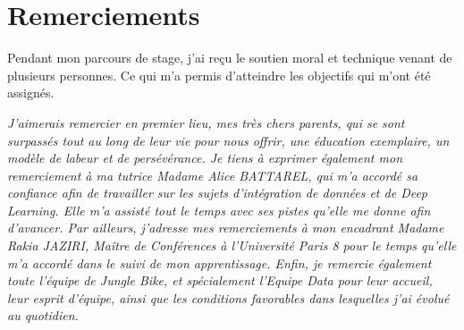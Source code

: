 
\chapter*{Remerciements}
Pendant mon parcours de stage, j'ai reçu le soutien moral et technique venant de plusieurs personnes. Ce qui m'a permis d'atteindre les objectifs qui m'ont été assignés.

\textit{J’aimerais remercier en premier lieu, mes très chers parents, qui se sont surpassés tout au
long de leur vie pour nous offrir, une éducation exemplaire, un modèle de
labeur et de persévérance.
\newline
\newline
Je tiens à exprimer également mon remerciement à ma tutrice Madame Alice BATTAREL, qui m'a accordé sa confiance afin de travailler sur les sujets d'intégration de données et de Deep Learning. Elle m'a assisté tout le temps avec ses pistes qu'elle me donne afin d'avancer.
\newline
\newline
Par ailleurs, j'adresse mes remerciements à mon encadrant Madame Rakia JAZIRI, Maître de Conférences à l'Université Paris 8 pour le temps qu'elle m'a accordé dans le suivi de mon apprentissage.
\newline
\newline
Enfin, je remercie également toute l'équipe de Jungle Bike, et spécialement l’Equipe Data pour
leur accueil, leur esprit d'équipe, ainsi que les conditions favorables dans lesquelles j’ai évolué au quotidien.}




